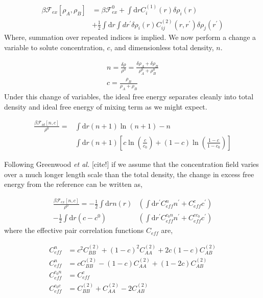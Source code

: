 \documentclass[showkeys, reprint]{revtex4-1}
\newcommand{\F}{\mathcal{F}}
\newcommand{\A}{\rho_A}
\newcommand{\B}{\rho_B}
\renewcommand{\d}{\mathrm{d}}
\renewcommand{\l}{\left}
\renewcommand{\r}{\right}
\newcommand{\f}{\frac}
\begin{document}
\begin{align}
	\beta\F_{ex}[\A, \B]  &= \beta \F_{ex}^0 + \int \d r C_i^{(1)}(r) \delta \rho_i(r) \\
		&+ \f{1}{2}\int \d r \int d r^\prime \delta \rho_i(r) C_{ij}^{(2)}(r, r^\prime) \delta \rho_j(r^\prime) \nonumber
\end{align}
Where, summation over repeated indices is implied. We now perform a change a variable to solute concentration, $c$, and dimensionless total density, $n$.

\begin{gather}
	n = \f{\delta \rho}{\rho^0} = \f{\delta \A + \delta \B}{\A^0 + \B^0} \\
	c = \f{\B}{\A + \B}
\end{gather}
Under this change of variables, the ideal free energy separates cleanly into total density and ideal free energy of mixing term as we might expect.

\begin{align}
	\f{\beta\F_{id}[n, c]}{\rho^0} = &\int \d r \l(n + 1\r) \ln\l(n + 1\r) - n  \\
	&\int \d r \l(n + 1 \r) \l[c\ln\l(\f{c}{c_0}\r) + (1 - c)\ln\l(\f{1 - c}{1 - c_0}\r)\r] \nonumber
\end{align}

Following Greenwood \textit{et al.} [cite!] if we assume that the concentration field varies over a much longer length scale than the total density, the change in excess free energy from the reference can be written as, 

\begin{align}
	\f{\beta \F_{ex}[n, c]}{\rho^0} = -\f{1}{2} \int \d r n(r) &\l( \int \d r^\prime C^n_{eff} n^\prime + C^c_{eff} c^\prime\r) \nonumber \\
	- \f{1}{2} \int \d r (c - c^0) &\l( \int \d r^\prime C^{c_0 n}_{eff} n^\prime + C^{c c_0}_{eff} c^\prime\r) 
\end{align}
where the effective pair correlation functions $C_{eff}$ are,

\begin{align}
	C_{eff}^n &= c^2 C_{BB}^{(2)} + (1 - c)^2 C_{AA}^{(2)} + 2c\l(1 - c\r) C_{AB}^{(2)} \\
	C_{eff}^n &= c C_{BB}^{(2)} - (1-c)C_{AA}^{(2)} + (1 - 2c) C_{AB}^{(2)} \\
	C_{eff}^{c_0 n} &= C_{eff}^c \\
	C_{eff}^{c_0 c} &= C_{BB}^{(2)} + C_{AA}^{(2)} - 2C_{AB}^{(2)}
\end{align}
\end{document}
